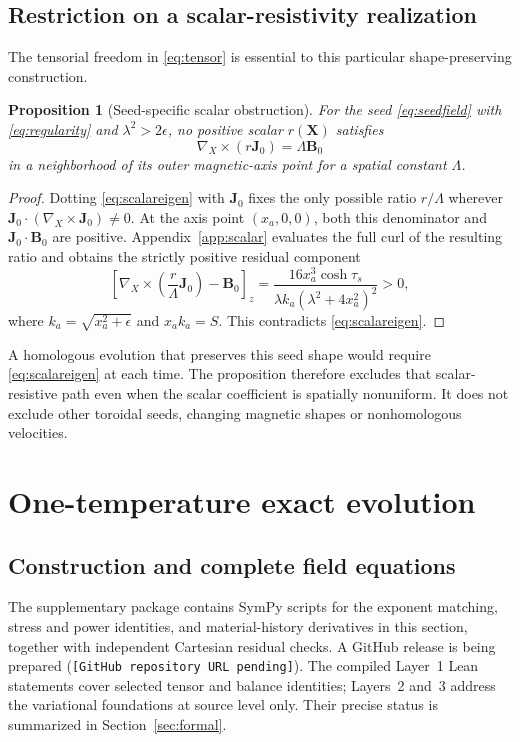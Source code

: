 \documentclass[11pt,a4paper]{article}
\newtheorem{proposition}{Proposition}
\theoremstyle{remark}\newtheorem{remark}{Remark}
\numberwithin{equation}{section}
\newcommand{\BB}{\boldsymbol B}
\newcommand{\JJ}{\boldsymbol J}
\newcommand{\XX}{\boldsymbol X}
\newcommand{\grad}{\nabla}
\newcommand{\repositoryplaceholder}{\texttt{[GitHub repository URL pending]}}
\begin{document}
\subsection{Restriction on a scalar-resistivity realization}
The tensorial freedom in \eqref{eq:tensor} is essential to this particular shape-preserving construction.
\begin{proposition}[Seed-specific scalar obstruction]\label{prop:scalar}
For the seed \eqref{eq:seedfield} with \eqref{eq:regularity} and $\lambda^2>2\epsilon$, no positive scalar $r(\XX)$ satisfies
\begin{equation}
\grad_X\!\times(r\JJ_0)=\Lambda\BB_0
\label{eq:scalareigen}
\end{equation}
in a neighborhood of its outer magnetic-axis point for a spatial constant $\Lambda$.
\end{proposition}
\begin{proof}
Dotting \eqref{eq:scalareigen} with $\JJ_0$ fixes the only possible ratio $r/\Lambda$ wherever $\JJ_0\cdot(\grad_X\!\times\JJ_0)\ne0$. At the axis point $(x_a,0,0)$, both this denominator and $\JJ_0\cdot\BB_0$ are positive. Appendix~\ref{app:scalar} evaluates the full curl of the resulting ratio and obtains the strictly positive residual component
\begin{equation}
\left[\grad_X\!\times\left(\frac r\Lambda\JJ_0\right)-\BB_0\right]_z
=\frac{16x_a^3\cosh\tau_s}
{\lambda k_a(\lambda^2+4x_a^2)^2}>0,
\label{eq:scalarresidual}
\end{equation}
where $k_a=\sqrt{x_a^2+\epsilon}$ and $x_ak_a=S$. This contradicts \eqref{eq:scalareigen}.
\end{proof}
A homologous evolution that preserves this seed shape would require \eqref{eq:scalareigen} at each time. The proposition therefore excludes that scalar-resistive path even when the scalar coefficient is spatially nonuniform. It does not exclude other toroidal seeds, changing magnetic shapes or nonhomologous velocities.


\section{One-temperature exact evolution}\label{sec:oneT}
\subsection{Construction and complete field equations}
The supplementary package contains SymPy scripts for the exponent matching, stress and power identities, and material-history derivatives in this section, together with independent Cartesian residual checks. A GitHub release is being prepared (\repositoryplaceholder). The compiled Layer~1 Lean statements cover selected tensor and balance identities; Layers~2 and~3 address the variational foundations at source level only. Their precise status is summarized in Section~\ref{sec:formal}.
\end{document}
